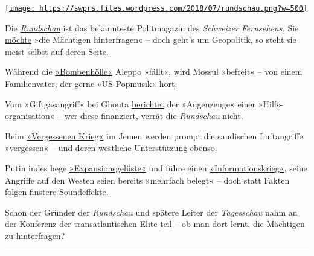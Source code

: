 \href{https://swprs.org/2017/03/01/srf-rundschau/}{\texttt{[image: https://swprs.files.wordpress.com/2018/07/rundschau.png?w=500]}}

Die
\emph{\href{https://de.wikipedia.org/wiki/Rundschau_(SRF)}{Rundschau}}
ist das bekannteste Polit­ma­ga­zin des \emph{Schweizer Fernsehens.} Sie
\href{https://www.srf.ch/sendungen/rundschau/50-jahre-rundschau-die-jubilaeumssendung}{möchte}
»die Mächtigen hinterfragen« -- doch geht's um Geo­po­litik, so steht
sie meist selbst auf deren Seite.

Während die
\href{https://www.srf.ch/sendungen/rundschau/subventionierte-piloten-vaeter-am-limit-bombenhoelle-aleppo}{»Bombenhölle«}
Aleppo »fällt«, wird Mossul »befreit« -- von einem Familien­vater, der
gerne »US-Popmusik«
\href{https://www.srf.ch/sendungen/rundschau/buben-beschneidung-michel-bollag-pkb-west-mossul}{hört}.

Vom »Giftgasangriff« bei Ghouta
\href{https://www.srf.ch/sendungen/rundschau/kriminaltouristen-verhuetungsmittel-j-bitzer-giftgaseinsatz}{berichtet}
der »Augen­zeuge« einer »Hilfs­organisation« -- wer diese
\href{http://www.uossm.org/who_we_are}{finanziert}, verrät die
\emph{Rundschau} nicht.

Beim
\href{https://www.srf.ch/sendungen/rundschau/gehorsam-und-ehelos-klamauk-statt-kompromiss-vergessener-krieg}{»Vergessenen
Krieg«} im Jemen werden prompt die saudischen Luftangriffe »vergessen«
-- und deren westliche
\href{https://www.strategic-culture.org/news/2018/06/18/western-media-whitewash-yemen-genocide.html}{Unterstützung}
ebenso.

Putin indes hege
\href{https://www.srf.ch/sendungen/rundschau/gianni-infantino-fatma-samoura-iv-kosovaren-zittern-vor-russen}{»Expansionsgelüste«}
und füh­re einen
\href{https://www.srf.ch/sendungen/rundschau/putins-informationskrieg-milliarden-jongleur-bastos-camorra}{»Informationskrieg«},
seine Angriffe auf den Westen seien bereits »mehrfach be­legt« -- doch
statt Fakten
\href{https://www.srf.ch/sendungen/rundschau/putins-informationskrieg-milliarden-jongleur-bastos-camorra}{folgen}
finstere Sound­effekte.

Schon der Gründer der \emph{Rundschau} und spätere Leiter der
\emph{Tagesschau} nahm an der Konferenz der trans­atlantischen Elite
\href{https://wikileaks.org/plusd/cables/1978ZURICH00660_d.html}{teil}
-- ob man dort lernt, die Mächtigen zu hinterfragen?

\begin{center}\rule{0.5\linewidth}{\linethickness}\end{center}

